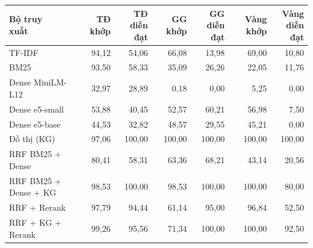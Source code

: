 \begin{tabular}{lrrrrrr}
\toprule
\makecell[l]{Bộ truy\\xuất} & TĐ khớp & \makecell[r]{TĐ diễn\\đạt} & GG khớp & \makecell[r]{GG diễn\\đạt} & Vàng khớp & \makecell[r]{Vàng\\diễn đạt} \\
\midrule
TF-IDF & 94{,}12 & 54{,}06 & 66{,}08 & 13{,}98 & 69{,}00 & 10{,}80 \\
BM25 & 93{,}50 & 58{,}33 & 35{,}09 & 26{,}26 & 22{,}05 & 11{,}76 \\
Dense MiniLM-L12 & 32{,}97 & 28{,}89 & 0{,}18 & 0{,}00 & 5{,}25 & 0{,}00 \\
Dense e5-small & 53{,}88 & 40{,}45 & 52{,}57 & 60{,}21 & 56{,}98 & 7{,}50 \\
Dense e5-base & 44{,}53 & 32{,}82 & 48{,}57 & 29{,}55 & 45{,}21 & 0{,}00 \\
Đồ thị (KG) & 97{,}06 & 100{,}00 & 100{,}00 & 100{,}00 & 100{,}00 & 100{,}00 \\
RRF BM25 + Dense & 80{,}41 & 58{,}31 & 63{,}36 & 68{,}21 & 43{,}14 & 20{,}56 \\
RRF BM25 + Dense + KG & 98{,}53 & 100{,}00 & 98{,}53 & 100{,}00 & 100{,}00 & 80{,}00 \\
RRF + Rerank & 97{,}79 & 94{,}44 & 61{,}14 & 95{,}00 & 96{,}84 & 52{,}50 \\
RRF + KG + Rerank & 99{,}26 & 95{,}56 & 71{,}34 & 100{,}00 & 100{,}00 & 92{,}50 \\
\bottomrule
\end{tabular}
